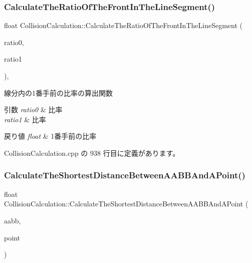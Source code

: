 \subsubsection{\texorpdfstring{Calculate\+The\+Ratio\+Of\+The\+Front\+In\+The\+Line\+Segment()}{CalculateTheRatioOfTheFrontInTheLineSegment()}}
{\footnotesize\ttfamily float Collision\+Calculation\+::\+Calculate\+The\+Ratio\+Of\+The\+Front\+In\+The\+Line\+Segment (\begin{DoxyParamCaption}\item[{float}]{ratio0,  }\item[{float}]{ratio1 }\end{DoxyParamCaption})\hspace{0.3cm}{\ttfamily [static]}, {\ttfamily [private]}}



線分内の1番手前の比率の算出関数 


\begin{DoxyParams}{引数}
{\em ratio0} & 比率 \\
\hline
{\em ratio1} & 比率 \\
\hline
\end{DoxyParams}

\begin{DoxyRetVals}{戻り値}
{\em float} & 1番手前の比率 \\
\hline
\end{DoxyRetVals}


 Collision\+Calculation.\+cpp の 938 行目に定義があります。

\mbox{\label{class_collision_calculation_ac06f2aa7df28c6331070b85d48760b59}} 
\subsubsection{\texorpdfstring{Calculate\+The\+Shortest\+Distance\+Between\+A\+A\+B\+B\+And\+A\+Point()}{CalculateTheShortestDistanceBetweenAABBAndAPoint()}}
{\footnotesize\ttfamily float Collision\+Calculation\+::\+Calculate\+The\+Shortest\+Distance\+Between\+A\+A\+B\+B\+And\+A\+Point (\begin{DoxyParamCaption}\item[{\mbox{\hyperlink{class_a_a_b_b}{A\+A\+BB}} $\ast$}]{aabb,  }\item[{\mbox{\hyperlink{class_vector3_d}{Vector3D}} $\ast$}]{point }\end{DoxyParamCaption})\hspace{0.3cm}{\ttfamily [private]}}



